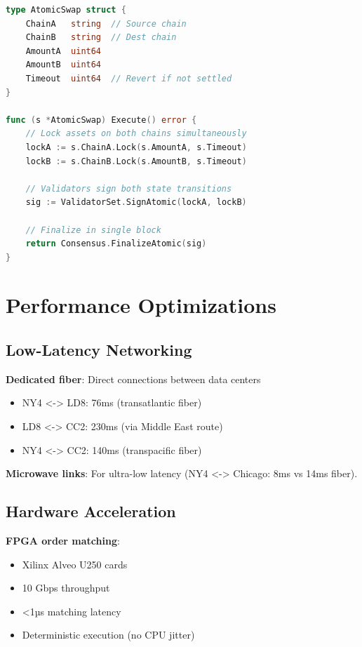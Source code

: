 \documentclass[11pt,letterpaper]{article}
\begin{document}
\begin{lstlisting}[language=Go]
type AtomicSwap struct {
    ChainA   string  // Source chain
    ChainB   string  // Dest chain
    AmountA  uint64
    AmountB  uint64
    Timeout  uint64  // Revert if not settled
}

func (s *AtomicSwap) Execute() error {
    // Lock assets on both chains simultaneously
    lockA := s.ChainA.Lock(s.AmountA, s.Timeout)
    lockB := s.ChainB.Lock(s.AmountB, s.Timeout)
    
    // Validators sign both state transitions
    sig := ValidatorSet.SignAtomic(lockA, lockB)
    
    // Finalize in single block
    return Consensus.FinalizeAtomic(sig)
}
\end{lstlisting}

\section{Performance Optimizations}

\subsection{Low-Latency Networking}

\textbf{Dedicated fiber}: Direct connections between data centers
\begin{itemize}
    \item NY4 <-> LD8: 76ms (transatlantic fiber)
    \item LD8 <-> CC2: 230ms (via Middle East route)
    \item NY4 <-> CC2: 140ms (transpacific fiber)
\end{itemize}

\textbf{Microwave links}: For ultra-low latency (NY4 <-> Chicago: 8ms vs 14ms fiber).

\subsection{Hardware Acceleration}

\textbf{FPGA order matching}:
\begin{itemize}
    \item Xilinx Alveo U250 cards
    \item 10 Gbps throughput
    \item <1µs matching latency
    \item Deterministic execution (no CPU jitter)
\end{itemize}
\end{document}
